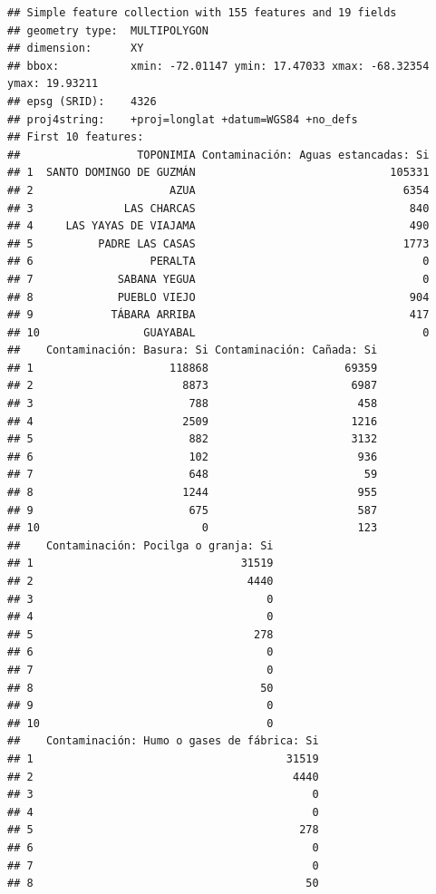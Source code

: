 \documentclass[11pt,]{article}
\begin{document}
\begin{verbatim}
## Simple feature collection with 155 features and 19 fields
## geometry type:  MULTIPOLYGON
## dimension:      XY
## bbox:           xmin: -72.01147 ymin: 17.47033 xmax: -68.32354 ymax: 19.93211
## epsg (SRID):    4326
## proj4string:    +proj=longlat +datum=WGS84 +no_defs
## First 10 features:
##                  TOPONIMIA Contaminación: Aguas estancadas: Si
## 1  SANTO DOMINGO DE GUZMÁN                              105331
## 2                     AZUA                                6354
## 3              LAS CHARCAS                                 840
## 4     LAS YAYAS DE VIAJAMA                                 490
## 5          PADRE LAS CASAS                                1773
## 6                  PERALTA                                   0
## 7             SABANA YEGUA                                   0
## 8             PUEBLO VIEJO                                 904
## 9            TÁBARA ARRIBA                                 417
## 10                GUAYABAL                                   0
##    Contaminación: Basura: Si Contaminación: Cañada: Si
## 1                     118868                     69359
## 2                       8873                      6987
## 3                        788                       458
## 4                       2509                      1216
## 5                        882                      3132
## 6                        102                       936
## 7                        648                        59
## 8                       1244                       955
## 9                        675                       587
## 10                         0                       123
##    Contaminación: Pocilga o granja: Si
## 1                                31519
## 2                                 4440
## 3                                    0
## 4                                    0
## 5                                  278
## 6                                    0
## 7                                    0
## 8                                   50
## 9                                    0
## 10                                   0
##    Contaminación: Humo o gases de fábrica: Si
## 1                                       31519
## 2                                        4440
## 3                                           0
## 4                                           0
## 5                                         278
## 6                                           0
## 7                                           0
## 8                                          50

\end{verbatim}
\end{document}
